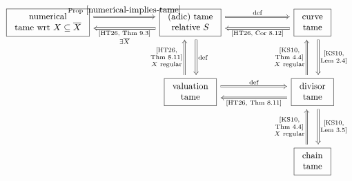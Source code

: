 \[
\begin{tikzcd}[column sep=7em, row sep=4em]
\fbox{\begin{tabular}{c}
numerical \\
tame wrt $X \subseteq \ov{X}$
\end{tabular}} 
\ar[r, Rightarrow, shift left=1.5ex, "\text{Prop}~\ref{numerical-implies-tame}"] 
& 
\fbox{\begin{tabular}{c}
(adic) tame \\
relative $S$
\end{tabular}}
\ar[l, Rightarrow, shift left=1.5ex, "\substack{\text{[HT26, Thm~9.3]} \\ \exists \ov X}"]
\ar[d, Rightarrow, shift left=1.5ex, "\text{def}"] 
\ar[r, Rightarrow, shift left=1.5ex, "\text{def}"] 
& 
\fbox{\begin{tabular}{c}
curve \\
tame
\end{tabular}}
\ar[l, Rightarrow, shift left=1.5ex, "\text{[HT26, Cor~8.12]}"]
\ar[d, Rightarrow, shift left=1.5ex, "\substack{\text{[KS10,} \\ \text{Lem~2.4]}}"]
\\
& 
\fbox{\begin{tabular}{c}
valuation \\
tame
\end{tabular}}
\ar[u, Rightarrow, shift left=1.5ex, "\substack{\text{[HT26,} \\ \text{Thm~8.11]} \\ \text{$X$ regular}}"]
\ar[r, Rightarrow, shift left=1.5ex, "\text{def}"]
&
\fbox{\begin{tabular}{c}
divisor \\
tame
\end{tabular}}
\ar[l, Rightarrow, shift left=1.5ex, "\text{[HT26, Thm~8.11]}"]
\ar[u, Rightarrow, shift left=1.5ex, "\substack{\text{[KS10,} \\ \text{Thm~4.4]} \\ \text{$X$ regular}}"] 
\ar[d, Rightarrow, shift left=1.5ex, "\substack{\text{[KS10,} \\ \text{Lem~3.5]}}"]
\\
&
&
\fbox{\begin{tabular}{c}
chain \\
tame
\end{tabular}}
\ar[u, Rightarrow, shift left=1.5ex, "\substack{\text{[KS10,} \\ \text{Thm~4.4]} \\ \text{$X$ regular}}"]
\end{tikzcd}
\]

